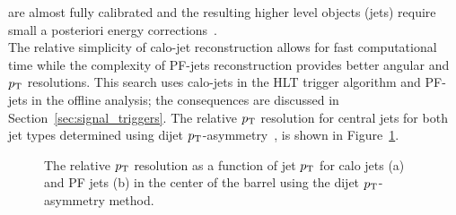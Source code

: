 are almost fully calibrated and the resulting higher level objects (jets) require small a posteriori 
energy corrections~\cite{Chatrchyan:2011ds}.\\
\indent The relative simplicity of calo-jet reconstruction allows for fast computational time while 
the complexity of PF-jets reconstruction provides better angular and $p_{\mathrm{T}}$ resolutions. This search 
uses calo-jets in the HLT trigger algorithm and PF-jets in the offline analysis; the consequences are 
discussed in Section~\ref{sec:signal_triggers}. The relative $p_{\mathrm{T}}$ resolution for central jets for both 
jet types determined using dijet $p_{\mathrm{T}}$-asymmetry~\cite{CMS-PAS-JME-10-014}, is shown in Figure~\ref{fig:jetRes}. 

\begin{figure}[h!]
  \begin{center}
      \caption{\label{fig:jetRes} The relative $p_{\mathrm{T}}$ resolution as a function of jet $p_{\mathrm{T}}$
              for calo jets (a) and PF jets (b) in the center of the barrel using the dijet
              $p_{\mathrm{T}}$-asymmetry method.}
  \end{center}
\end{figure}

%
